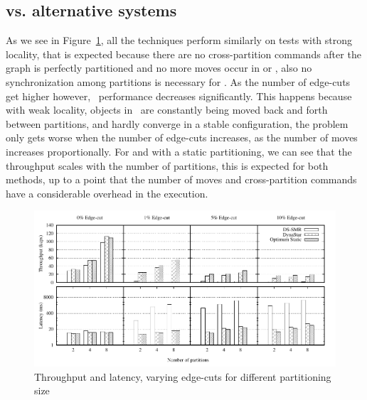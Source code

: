 \subsection{\dynastar vs. alternative systems}
\label{sec:evaluation:results}

As we see in Figure~\ref{fig:varying_edge_cut}, all the techniques perform similarly on tests with strong locality, that is
expected because there are no cross-partition commands after the graph is perfectly partitioned and no more moves 
occur in \dynastar or \dssmr, also no synchronization among partitions is necessary for \ssmr.
As the number of edge-cuts get higher however, \dssmr\ performance decreases significantly.
This happens because with weak locality, objects in \dssmr\ are constantly being moved back and forth between partitions,
and hardly converge in a stable configuration, the problem only gets worse when the number of edge-cuts increases, as
the number of moves increases proportionally.
For \dynastar and \ssmr with a static partitioning, we can see that the throughput scales 
with the number of partitions, this is expected for both methods, up to a point that the number of moves and cross-partition
commands have a considerable overhead in the execution.

\begin{figure}[ht!]
	\includegraphics{figures/experiments/throughput-latency-avg-all}
	\caption{Throughput and latency, varying edge-cuts for different partitioning size}
	\label{fig:varying_edge_cut}
\end{figure}

